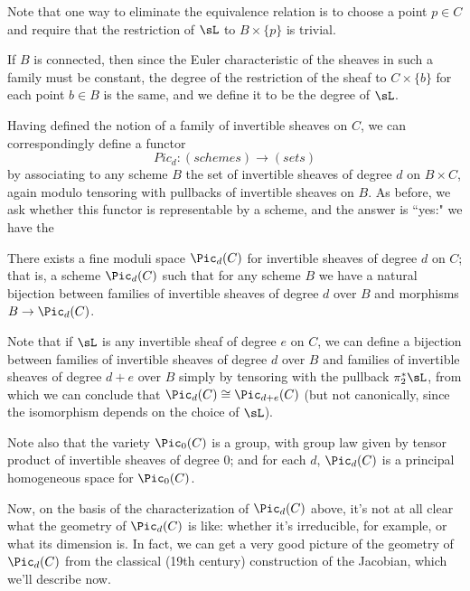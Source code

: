 Note that one way to eliminate the equivalence relation is to choose a point $p \in C$ and require that the restriction of $\sL$ to $B \times \{p\}$ is trivial.
 
 
 If $B$ is connected, then since the Euler characteristic of the sheaves in such a family must be constant, the degree of the restriction of 
 the sheaf to $C\times \{b\}$ for each point $b\in B$ is the same, and we define it to be the degree of $\sL$. 
 
 Having defined the notion of a family of invertible sheaves on $C$, we can correspondingly define a functor
 $$
 Pic_d : (schemes) \to (sets)
 $$
 by associating to any scheme $B$ the set of invertible sheaves of degree $d$ on $B \times C$, again modulo tensoring with pullbacks of invertible sheaves on $B$. As before, we ask whether this functor is representable by a scheme, and the answer is ``yes:" we have the
 
 \begin{fact}
 There exists a fine moduli space $\Pic_d(C)$ for invertible sheaves of degree $d$ on $C$; that is, a scheme $\Pic_d(C)$ such that for any scheme $B$ we have a natural bijection between families of invertible sheaves of degree $d$ over $B$ and morphisms $B \to \Pic_d(C)$.
 \end{fact}
 
 Note that if $\sL$ is any invertible sheaf of degree $e$ on $C$, we can define a bijection between families of invertible sheaves of degree $d$ over $B$ and families of invertible sheaves of degree $d+e$ over $B$ simply by tensoring with the pullback $\pi_2^*\sL$, from which we can conclude that $\Pic_d(C) \cong \Pic_{d+e}(C)$ (but not canonically, since the isomorphism depends on the choice of $\sL$).
 
 Note also that the variety $\Pic_0(C)$ is a group, with group law given by tensor product of invertible sheaves of degree 0; and for each $d$, $\Pic_d(C)$ is a principal homogeneous space for $\Pic_0(C)$. 
 
 Now, on the basis of the characterization of $\Pic_d(C)$ above, it's not at all clear what the geometry of $\Pic_d(C)$ is like: whether it's irreducible, for example, or what its dimension is. In fact, we can get a very good picture of the geometry of $\Pic_d(C)$ from the classical (19th century) construction of the Jacobian, which we'll describe now.
 
